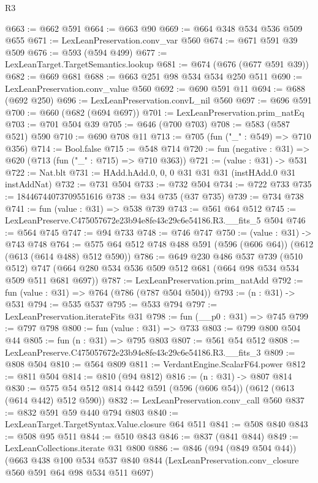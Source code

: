 \begin{lexlean}{R3}
\begin{coremodule}
@663 := @662 @591
@664 := @663 @90
@669 := @664 @348 @534 @536 @509 @655
@671 := LexLeanPreservation.conv_var @560
@674 := @671 @591 @39 @509
@676 := @593 (@594 @499)
@677 := LexLeanTarget.TargetSemantics.lookup
@681 := @674 (@676 (@677 @591 @39))
@682 := @669 @681
@688 := @663 @251 @98 @534 @534 @250 @511
@690 := LexLeanPreservation.conv_value @560
@692 := @690 @591 @11
@694 := @688 (@692 @250)
@696 := LexLeanPreservation.convL_nil @560
@697 := @696 @591
@700 := @660 (@682 (@694 @697))
@701 := LexLeanPreservation.prim_natEq
@703 := @701 @504 @39
@705 := @646 (@700 @703)
@708 := @583 (@587 @521) @590
@710 := @690 @708 @11
@713 := @705 (fun ("_" : @549) => @710 @356)
@714 := Bool.false
@715 := @548 @714
@720 := fun (negative : @31) => @620 (@713 (fun ("_" : @715) => @710 @363))
@721 := (value : @31) -> @531
@722 := Nat.blt
@731 := HAdd.hAdd.{0, 0, 0} @31 @31 @31 (instHAdd.{0} @31 instAddNat)
@732 := @731 @504
@733 := @732 @504
@734 := @722 @733
@735 := 18446744073709551616
@738 := @34 @735 (@37 @735)
@739 := @734 @738
@741 := fun (value : @31) => @538 @739
@743 := @561 @64 @512
@745 := LexLeanPreserve.C475057672e23b94e8fe43c29c6e54186.R3.__fits_5 @504
@746 := @564 @745
@747 := @94 @733
@748 := @746 @747
@750 := (value : @31) -> @743 @748
@764 := @575 @64 @512 @748 @488 @591 (@596 (@606 @64)) (@612 (@613 (@614 @488) @512 @590))
@786 := @649
    @230
    @486
    @537
    @739
    (@510 @512)
    @747
    (@664 @280 @534 @536 @509 @512 @681 (@664 @98 @534 @534 @509 @511 @681 @697))
@787 := LexLeanPreservation.prim_natAdd
@792 := fun (value : @31) => @764 (@786 (@787 @504 @504))
@793 := (n : @31) -> @531
@794 := @535 @537
@795 := @533 @794
@797 := LexLeanPreservation.iterateFits @31
@798 := fun (__p0 : @31) => @745
@799 := @797 @798
@800 := fun (value : @31) => @733
@803 := @799 @800 @504 @44
@805 := fun (n : @31) => @795 @803
@807 := @561 @54 @512
@808 := LexLeanPreserve.C475057672e23b94e8fe43c29c6e54186.R3.__fits_3
@809 := @808 @504
@810 := @564 @809
@811 := VerdantEngine.ScalarF64.power
@812 := @811 @504
@814 := @810 (@94 @812)
@816 := (n : @31) -> @807 @814
@830 := @575 @54 @512 @814 @442 @591 (@596 (@606 @54)) (@612 (@613 (@614 @442) @512 @590))
@832 := LexLeanPreservation.conv_call @560
@837 := @832 @591 @59 @440 @794 @803
@840 := LexLeanTarget.TargetSyntax.Value.closure @64 @511
@841 := @508 @840
@843 := @508 @95 @511
@844 := @510 @843
@846 := @837 (@841 @844)
@849 := LexLeanCollections.iterate @31 @800
@886 := @846
    (@94 (@849 @504 @44))
    (@663
      @438
      @100
      @534
      @537
      @840
      @844
      (LexLeanPreservation.conv_closure @560 @591 @64 @98 @534 @511 @697)

\end{coremodule}
\end{lexlean}
